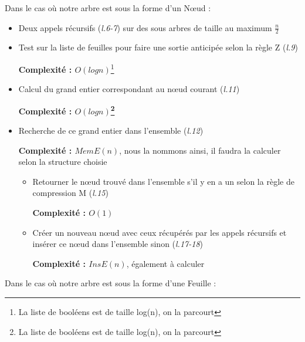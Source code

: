 \documentclass[12pt,a4paper]{article}
\begin{document}
\bigskip
Dans le cas où notre arbre est sous la forme d'un Nœud : 

\bigskip

\begin{itemize}
\item Deux appels récursifs (\textit{l.6-7}) sur des sous arbres de taille au maximum $\frac{n}{2}$
\item Test sur la liste de feuilles pour faire une sortie anticipée selon la règle Z (\textit{l.9}) 

\textbf{Complexité : $O(log n)$}\footnote{La liste de booléens est de taille log(n), on la parcourt}

\item Calcul du grand entier correspondant au nœud courant (\textit{l.11}) 

\textbf{Complexité : $O(log n)$\footnote{La liste de booléens est de taille log(n), on la parcourt}} 

\item Recherche de ce grand entier dans l'ensemble (\textit{l.12}) 

\textbf{Complexité : $MemE(n)$}, nous la nommons ainsi, il faudra la calculer selon la structure choisie

\begin{itemize}
\item Retourner le nœud trouvé dans l'ensemble s'il y en a un selon la règle de compression M (\textit{l.15}) 

\textbf{Complexité : $O(1)$}

\item Créer un nouveau nœud avec ceux récupérés par les appels récursifs et insérer ce nœud dans l'ensemble sinon (\textit{l.17-18})

\textbf{Complexité : $InsE(n)$}, également à calculer
\end{itemize}

\end{itemize}

\bigskip
Dans le cas où notre arbre est sous la forme d'une Feuille : 
\bigskip
\end{document}
